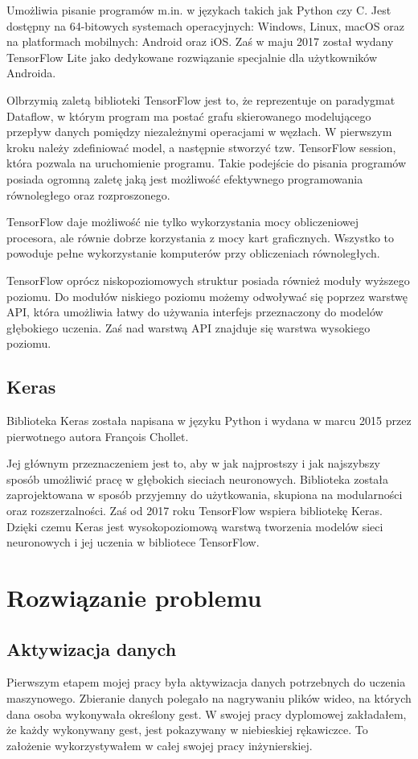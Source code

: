 \documentclass[a4paper,12pt,twoside,openany]{report}
\begin{document}
Umożliwia pisanie programów m.in. w językach takich jak Python czy C. Jest dostępny na 64-bitowych systemach operacyjnych: Windows, Linux, macOS oraz na platformach mobilnych: Android oraz iOS. Zaś w maju 2017 został wydany TensorFlow Lite jako dedykowane rozwiązanie specjalnie dla użytkowników Androida\cite{tensorflowlite}.

Olbrzymią zaletą biblioteki TensorFlow jest to, że reprezentuje on paradygmat Dataflow, w którym program ma postać grafu skierowanego modelującego przepływ danych pomiędzy niezależnymi operacjami w węzłach. W pierwszym kroku należy zdefiniować model, a następnie stworzyć tzw. TensorFlow session, która pozwala na uruchomienie programu. Takie podejście do pisania programów posiada ogromną zaletę jaką jest możliwość efektywnego programowania równoległego oraz rozproszonego\cite{tensorflowG}. 

TensorFlow daje możliwość nie tylko wykorzystania mocy obliczeniowej procesora, ale równie dobrze korzystania z mocy kart graficznych. Wszystko to powoduje pełne wykorzystanie komputerów przy obliczeniach równoległych.

TensorFlow oprócz niskopoziomowych struktur posiada również moduły wyższego poziomu. Do modułów niskiego poziomu możemy odwoływać się poprzez warstwę API, która umożliwia łatwy do używania interfejs przeznaczony do modelów głębokiego uczenia. Zaś nad warstwą API znajduje się warstwa wysokiego poziomu.

\section{Keras}
Biblioteka Keras została napisana w języku Python i wydana w marcu 2015 przez pierwotnego autora François Chollet\cite{keras}. 

Jej głównym przeznaczeniem jest to, aby w jak najprostszy i  jak najszybszy sposób umożliwić pracę w głębokich sieciach neuronowych. Biblioteka została zaprojektowana w sposób przyjemny do użytkowania, skupiona na modularności oraz rozszerzalności. Zaś od 2017 roku TensorFlow wspiera bibliotekę Keras. Dzięki czemu Keras jest wysokopoziomową warstwą tworzenia modelów sieci neuronowych i jej uczenia w bibliotece TensorFlow.

\chapter{Rozwiązanie problemu}
\section{Aktywizacja danych}
Pierwszym etapem mojej pracy była aktywizacja danych potrzebnych do uczenia maszynowego. Zbieranie danych polegało na nagrywaniu plików wideo, na których dana osoba wykonywała określony gest. W swojej pracy dyplomowej zakładałem, że każdy wykonywany gest, jest pokazywany w niebieskiej rękawiczce. To założenie wykorzystywałem w całej swojej pracy inżynierskiej.
\end{document}
